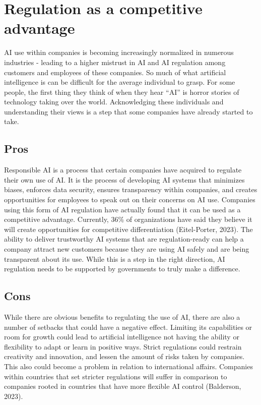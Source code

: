 \documentclass[
]{book}
\begin{document}
\hypertarget{regulation-as-a-competitive-advantage}{%
\section{Regulation as a competitive advantage}\label{regulation-as-a-competitive-advantage}}

AI use within companies is becoming increasingly normalized in numerous industries - leading to a higher mistrust in AI and AI regulation among customers and employees of these companies. So much of what artificial intelligence is can be difficult for the average individual to grasp. For some people, the first thing they think of when they hear ``AI'' is horror stories of technology taking over the world. Acknowledging these individuals and understanding their views is a step that some companies have already started to take.

\hypertarget{pros}{%
\subsection{Pros}\label{pros}}

Responsible AI is a process that certain companies have acquired to regulate their own use of AI. It is the process of developing AI systems that minimizes biases, enforces data security, ensures transparency within companies, and creates opportunities for employees to speak out on their concerns on AI use. Companies using this form of AI regulation have actually found that it can be used as a competitive advantage. Currently, 36\% of organizations have said they believe it will create opportunities for competitive differentiation (Eitel-Porter, 2023). The ability to deliver trustworthy AI systems that are regulation-ready can help a company attract new customers because they are using AI safely and are being transparent about its use. While this is a step in the right direction, AI regulation needs to be supported by governments to truly make a difference.

\hypertarget{cons}{%
\subsection{Cons}\label{cons}}

While there are obvious benefits to regulating the use of AI, there are also a number of setbacks that could have a negative effect. Limiting its capabilities or room for growth could lead to artificial intelligence not having the ability or flexibility to adapt or learn in positive ways. Strict regulations could restrain creativity and innovation, and lessen the amount of risks taken by companies. This also could become a problem in relation to international affairs. Companies within countries that set stricter regulations will suffer in comparison to companies rooted in countries that have more flexible AI control (Balderson, 2023).
\end{document}
